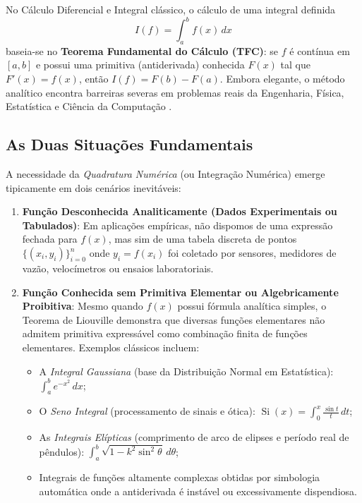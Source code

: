 \documentclass[11pt,a4paper]{article}
\begin{document}
No Cálculo Diferencial e Integral clássico, o cálculo de uma integral definida
\begin{equation}
    I(f) = \int_{a}^{b} f(x)\,dx
\end{equation}
baseia-se no \textbf{Teorema Fundamental do Cálculo (TFC)}: se $f$ é contínua em $[a, b]$ e possui uma primitiva (antiderivada) conhecida $F(x)$ tal que $F'(x) = f(x)$, então $I(f) = F(b) - F(a)$. Embora elegante, o método analítico encontra barreiras severas em problemas reais da Engenharia, Física, Estatística e Ciência da Computação \cite{santos2010, ruggiero1996, burden2016, mesquita2026}.

\subsection{As Duas Situações Fundamentais}
A necessidade da \emph{Quadratura Numérica} (ou Integração Numérica) emerge tipicamente em dois cenários inevitáveis:
\begin{enumerate}[leftmargin=1.6em]
    \item \textbf{Função Desconhecida Analiticamente (Dados Experimentais ou Tabulados)}: Em aplicações empíricas, não dispomos de uma expressão fechada para $f(x)$, mas sim de uma tabela discreta de pontos $\{(x_i, y_i)\}_{i=0}^n$ onde $y_i = f(x_i)$ foi coletado por sensores, medidores de vazão, velocímetros ou ensaios laboratoriais.
    \item \textbf{Função Conhecida sem Primitiva Elementar ou Algebricamente Proibitiva}: Mesmo quando $f(x)$ possui fórmula analítica simples, o Teorema de Liouville demonstra que diversas funções elementares não admitem primitiva expressável como combinação finita de funções elementares. Exemplos clássicos incluem:
    \begin{itemize}
        \item A \emph{Integral Gaussiana} (base da Distribuição Normal em Estatística): $\int_a^b e^{-x^2}\,dx$;
        \item O \emph{Seno Integral} (processamento de sinais e ótica): $\operatorname{Si}(x) = \int_0^x \frac{\sin t}{t}\,dt$;
        \item As \emph{Integrais Elípticas} (comprimento de arco de elipses e período real de pêndulos): $\int_a^b \sqrt{1 - k^2 \sin^2 \theta}\,d\theta$;
        \item Integrais de funções altamente complexas obtidas por simbologia automática onde a antiderivada é instável ou excessivamente dispendiosa.
    \end{itemize}
\end{enumerate}
\end{document}
